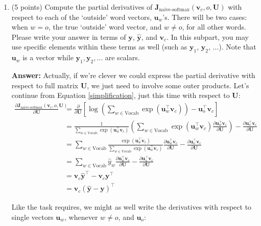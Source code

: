 \documentclass{article}
\newenvironment{answer}{
    {\bf Answer:} \sf \begingroup\color{red}
}{\endgroup}%
\begin{document}
\begin{enumerate}[label=(\alph*)]
\begin{shaded}
\begin{answer}
\end{answer}
\end{shaded}

\item (5 points) Compute the partial derivatives of $\bm J_{\text{naive-softmax}}(\bm v_c, o, \bm U)$ with respect to each of the `outside' word vectors, $\bm u_w$'s. There will be two cases: when $w=o$, the true `outside' word vector, and $w \neq o$, for all other words. Please write your answer in terms of $\bm y$, $\hat{\bm y}$, and $\bm v_c$. In this subpart, you may use specific elements within these terms as well (such as $\bm y_1$, $\bm y_2$, $\dots$). Note that $\bm u_w$ is a vector while $\bm y_1, \bm y_2, \dots$ are scalars.

\begin{shaded}
\begin{answer} Actually, if we're clever we could express the partial derivative with respect to full matrix $\bm U$, we just need to involve some outer products. Let's continue from Equation \ref{simplification}, just this time with respect to $\bm U$:
\begin{align}
\frac{\partial \bm J_{\text{naive-softmax}}(\bm v_c, o, \bm U)}{\partial \bm U} &= \frac{\partial}{\partial \bm U} \left[\log\left(\sum_{w \in \text{Vocab}} \exp(\bm u_{w}^\top \bm v_c)\right)-\bm u_{o}^\top \bm v_c\right] \\
&= \frac{1}{\sum_{w \in \text{Vocab}} \exp(\bm u_{w}^\top \bm v_c)}\left(\sum_{w \in \text{Vocab}} \exp(\bm u_{w}^\top \bm v_c) \frac{\partial \bm u_w^{\top}\bm v_c}{\partial \bm U} \right) - \frac{\partial \bm u_o^{\top}\bm v_c}{\partial \bm U} \\
&= \sum_{w \in \text{Vocab}} \frac{\exp(\bm u_{w}^\top \bm v_c)}{\sum_{w \in \text{Vocab}} \exp(\bm u_{w}^\top \bm v_c)}\frac{\partial \bm u_w^{\top}\bm v_c}{\partial \bm U} - \frac{\partial \bm u_o^{\top}\bm v_c}{\partial \bm U} \\
&= \sum_{w \in \text{Vocab}} \hat y_w\frac{\partial \bm u_w^{\top}\bm v_c}{\partial \bm U} - \frac{\partial \bm u_o^{\top}\bm v_c}{\partial \bm U} \\
&=\bm v_c \hat{\bm y}^{\top} - \bm v_c \bm y^{\top} \\
&=\label{wrtU} \bm v_c (\hat{\bm y} - \bm y)^{\top}
\end{align}

Like the task requires, we might as well write the derivatives with respect to single vectors $\bm u_w$, whenever $w\ne o$, and $\bm u_o$:


\end{answer}
\end{shaded}
\end{enumerate}
\end{document}
